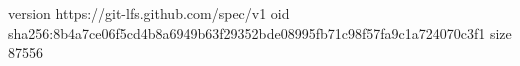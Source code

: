 version https://git-lfs.github.com/spec/v1
oid sha256:8b4a7ce06f5cd4b8a6949b63f29352bde08995fb71c98f57fa9c1a724070c3f1
size 87556
